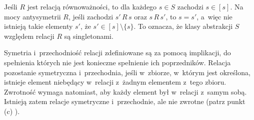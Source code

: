 \exercise %
Jeśli $R$ jest relacją równoważności, to dla każdego $s\in S$ zachodzi $s\in[s]$.
Na mocy antysymetrii $R$, jeśli zachodzi $s'\,R\,s$ oraz $s\,R\,s'$, to $s=s'$, a~więc nie istnieją takie elementy $s'$, że $s'\in[s]\setminus\{s\}$.
To oznacza, że klasy abstrakcji $S$ względem relacji $R$ są singletonami.

\exercise %
Symetria i~przechodniość relacji zdefiniowane są za pomocą implikacji, do spełnienia których nie jest konieczne spełnienie ich poprzedników.
Relacja pozostanie symetryczna i~przechodnia, jeśli w~zbiorze, w~którym jest określona, istnieje element niebędący w~relacji z~żadnym elementem z~tego zbioru.
Zwrotność wymaga natomiast, aby każdy element był w~relacji z~samym sobą.
Istnieją zatem relacje symetryczne i~przechodnie, ale nie zwrotne (patrz punkt (c) ).

